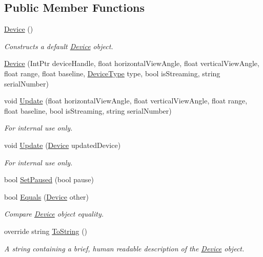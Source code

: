 \subsection*{Public Member Functions}
\begin{DoxyCompactItemize}
\item 
\mbox{\hyperlink{class_leap_1_1_device_a074c5d121d3c6f2cb63046bd6a14efa5}{Device}} ()
\begin{DoxyCompactList}\small\item\em Constructs a default \mbox{\hyperlink{class_leap_1_1_device}{Device}} object. \end{DoxyCompactList}\item 
\mbox{\hyperlink{class_leap_1_1_device_ad3cd1e47bb4dbec92a449ad6892a385a}{Device}} (Int\+Ptr device\+Handle, float horizontal\+View\+Angle, float vertical\+View\+Angle, float range, float baseline, \mbox{\hyperlink{class_leap_1_1_device_acbae26ae873dec763876ed257b38456f}{Device\+Type}} type, bool is\+Streaming, string serial\+Number)
\item 
void \mbox{\hyperlink{class_leap_1_1_device_a72984bfbe2d07d19cc36733cb5be4228}{Update}} (float horizontal\+View\+Angle, float vertical\+View\+Angle, float range, float baseline, bool is\+Streaming, string serial\+Number)
\begin{DoxyCompactList}\small\item\em For internal use only. \end{DoxyCompactList}\item 
void \mbox{\hyperlink{class_leap_1_1_device_a90d415256fe46eedeafb5611171c0d94}{Update}} (\mbox{\hyperlink{class_leap_1_1_device}{Device}} updated\+Device)
\begin{DoxyCompactList}\small\item\em For internal use only. \end{DoxyCompactList}\item 
bool \mbox{\hyperlink{class_leap_1_1_device_aa3026a1e811bc6a428794c6e98eeab3a}{Set\+Paused}} (bool pause)
\item 
bool \mbox{\hyperlink{class_leap_1_1_device_a23f53a24a560cb01806794cb138a4a7c}{Equals}} (\mbox{\hyperlink{class_leap_1_1_device}{Device}} other)
\begin{DoxyCompactList}\small\item\em Compare \mbox{\hyperlink{class_leap_1_1_device}{Device}} object equality. \end{DoxyCompactList}\item 
override string \mbox{\hyperlink{class_leap_1_1_device_a8bff03e26540763986df979439b032e7}{To\+String}} ()
\begin{DoxyCompactList}\small\item\em A string containing a brief, human readable description of the \mbox{\hyperlink{class_leap_1_1_device}{Device}} object. \end{DoxyCompactList}\end{DoxyCompactItemize}

